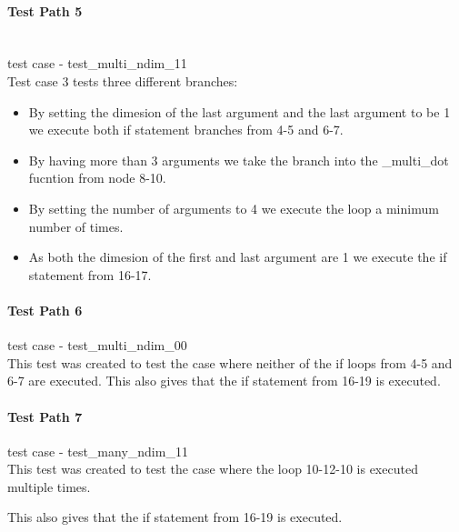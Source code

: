 \paragraph{Test Path 5}\\

test case - test\_multi\_ndim\_11\\
Test case 3 tests three different branches:\\
\begin{itemize}
\item By setting the dimesion of the last argument and the last argument to be 1  we execute both if statement branches from 4-5 and  6-7.
\item By having more than 3 arguments we take the branch into the \_multi\_dot fucntion from node 8-10. 
\item By setting the number of arguments to 4 we execute the loop a minimum number of times.   
\item As both the dimesion of the first and last argument are 1 we execute the if statement from 16-17.   
\end{itemize}


\paragraph{Test Path 6}

test case - test\_multi\_ndim\_00\\
This test was created to test the case where neither of the if loops from 4-5 and 6-7 are executed. This also gives that the if statement from 16-19 is executed.  


\paragraph{Test Path 7}
test case - test\_many\_ndim\_11\\

This test was created to test the case where the loop 10-12-10 is executed multiple times.

 This also gives that the if statement from 16-19 is executed.  


